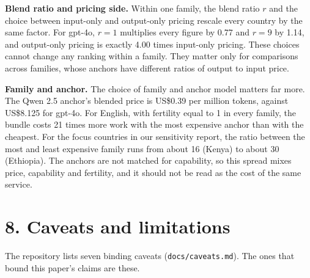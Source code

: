 \documentclass[11pt]{article}
\begin{document}
\textbf{Blend ratio and pricing side.} Within one family, the blend ratio \(r\) and the choice between input-only and output-only pricing rescale every country by the same factor. For gpt-4o, \(r = 1\) multiplies every figure by 0.77 and \(r = 9\) by 1.14, and output-only pricing is exactly 4.00 times input-only pricing. These choices cannot change any ranking within a family. They matter only for comparisons across families, whose anchors have different ratios of output to input price.

\textbf{Family and anchor.} The choice of family and anchor model matters far more. The Qwen 2.5 anchor's blended price is US\$0.39 per million tokens, against US\$8.125 for gpt-4o. For English, with fertility equal to 1 in every family, the bundle costs 21 times more work with the most expensive anchor than with the cheapest. For the focus countries in our sensitivity report, the ratio between the most and least expensive family runs from about 16 (Kenya) to about 30 (Ethiopia). The anchors are not matched for capability, so this spread mixes price, capability and fertility, and it should not be read as the cost of the same service.

\section{8. Caveats and limitations}

The repository lists seven binding caveats (\texttt{docs/caveats.md}). The ones that bound this paper's claims are these.
\end{document}
